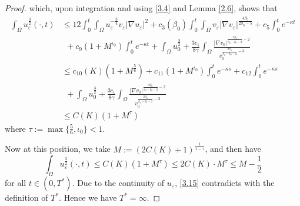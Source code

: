 \documentclass[12pt]{article}
\theoremstyle{plain}
\newtheorem{lemma}{Lemma}[section]
\theoremstyle{definition}
\numberwithin{equation}{section}
\begin{document}
\begin{proof}
which, upon integration and using \eqref{3.4} and Lemma \ref{2.6}, shows that
\begin{align}\label{3.14}
       \int_\Omega u_\varepsilon^{\frac{3}{2}}(\cdot,t)&\leq 12\int_0^t\int_{\Omega}u_\varepsilon^{-\frac{3}{4}}v_\varepsilon|\nabla u_\varepsilon|^2\nonumber+c_3(\beta_0)\int_0^t\int_\Omega v_\varepsilon|\nabla v_\varepsilon|^{\frac{4\beta_0}{2\beta_0-5}}+c_5\int_0^t e^{-\kappa t}\\
       &~~+c_9 (1+M^{\iota_0})\int_0^t e^{-\kappa t}+\int_\Omega u_0^{\frac{3}{2}}+\frac{3c_1}{8\gamma}
       \int_\Omega\frac{|\nabla v_0|^{\frac{2\beta_0}{\beta_0-k_0-2}-2}}
       {v_0^{\frac{2\beta_0}{\beta_0-k_0-2}-3}}\\
       &\leq c_{10}(K)(1+M^{\frac{5}{6}})+c_{11}(1+ M^{\iota_0})\int_0^{t}e^{-\kappa s}+c_{12}\int_0^{t}e^{-\kappa s}\nonumber\\
       &~~+\int_\Omega u_0^{\frac{3}{2}}
       +\frac{3c_1}{8\gamma}\int_\Omega\frac{|\nabla v_0|^{\frac{2\beta_0}{\beta_0-k_0-2}-2}}
       {v_0^{\frac{2\beta_0}{\beta_0-k_0-2}-3}}\nonumber\\
       &\leq C(K)(1+M^{\tau})\nonumber
\end{align}
where $\tau:=\max\{\frac{5}{6},\iota_0\}<1$.

Now at this position, we take  $M:=(2C(K)+1
)^{\frac{1}{1-\tau}}$, and then have
\begin{equation}\label{3.15}
    \int_\Omega u_\varepsilon^{\frac{3}{2}}(\cdot,t)\leq C(K)(1+ M^{\tau})\leq 2C(K)\cdot M^{\tau}\leq M-\frac 12
\end{equation}
for all $t\in(0,T^*)$. Due to the continuity of $u_\varepsilon$, \eqref{3.15} contradicts with the definition of $T^*$. Hence we have $T^*=\infty$.
\end{proof}
\end{document}
